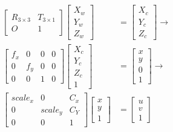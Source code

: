 \documentclass{article}
\begin{document}
\begin{align}
    \begin{bmatrix}
        R_{3\times3} & T_{3\times1} \\O & 1
    \end{bmatrix}\begin{bmatrix}
                     X_w \\ Y_w \\ Z_w
                 \end{bmatrix} & = \begin{bmatrix}
                                       X_c \\ Y_c \\ Z_c
                                   \end{bmatrix} \rightarrow \\\begin{bmatrix}
        f_x & 0   & 0 & 0 \\
        0   & f_y & 0 & 0 \\
        0   & 0   & 1 & 0
    \end{bmatrix}\begin{bmatrix}
        X_c \\Y_c\\Z_c\\1
    \end{bmatrix}&= \begin{bmatrix}
        x \\y\\0\\1
    \end{bmatrix} \rightarrow\\
    \begin{bmatrix}
        scale_x & 0       & C_x \\
        0       & scale_y & C_Y \\
        0       & 0       & 1
    \end{bmatrix}\begin{bmatrix}
        x\\y\\1        
    \end{bmatrix} &=\begin{bmatrix}
        u\\v\\1
    \end{bmatrix}  
\end{align}
\end{document}
